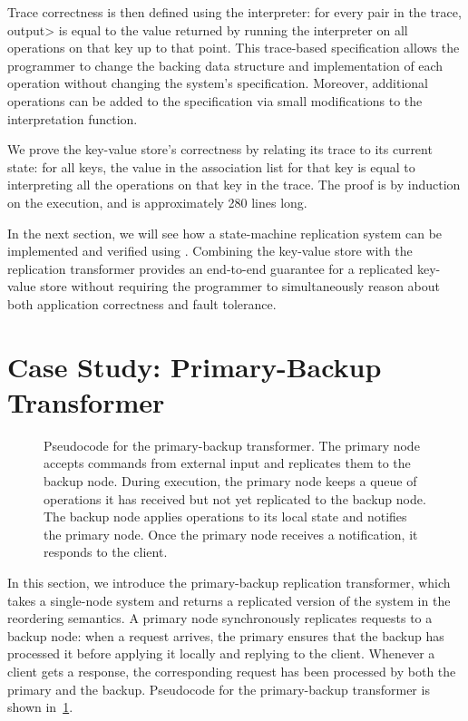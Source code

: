 Trace correctness is then defined using the interpreter: for every
 pair in the trace,
\<output> is equal to the value returned by running the
interpreter on all operations on that key up to that point.
This trace-based specification allows the programmer to change the
backing data structure and implementation of each operation
without changing the system's specification. Moreover, additional
operations can be added to the specification via small modifications to the
interpretation function.

We prove the key-value store's correctness by relating its trace to
its current state: for all keys, the value in the association list for
that key is equal to interpreting all the operations on that key in
the trace. The proof is by induction on the execution, and is
approximately 280 lines long.

In the next section, we will see how a state-machine replication
system can be implemented and verified using \Verdi. Combining the
key-value store with the replication transformer provides an
end-to-end guarantee for a replicated key-value store without
requiring the programmer to simultaneously reason about both
application correctness and fault tolerance.

\section{Case Study: Primary-Backup Transformer}\label{sec:verdi:casestudy-pbj}

\begin{figure}[t]
  \centering
  

  \caption{Pseudocode for the primary-backup transformer. The primary node
    accepts commands from external input and replicates them to the backup
    node.  During execution, the primary node keeps a queue of operations
    it has received but not yet replicated to the backup node. The backup
    node applies operations to its local state and notifies the primary node.
    Once the primary node receives a notification, it responds to the client.}

\label{fig:pbj-code}
\end{figure}

In this section, we introduce the primary-backup replication transformer,
which takes a single-node system and returns a replicated version of the
system in the reordering semantics. A primary node synchronously replicates
requests to a backup node: when a request arrives, the primary ensures that
the backup has processed it before applying it locally and replying to the
client. Whenever a client gets a response, the corresponding request has
been processed by both the primary and the backup. Pseudocode for the
primary-backup transformer is shown in~\cref{fig:pbj-code}.

